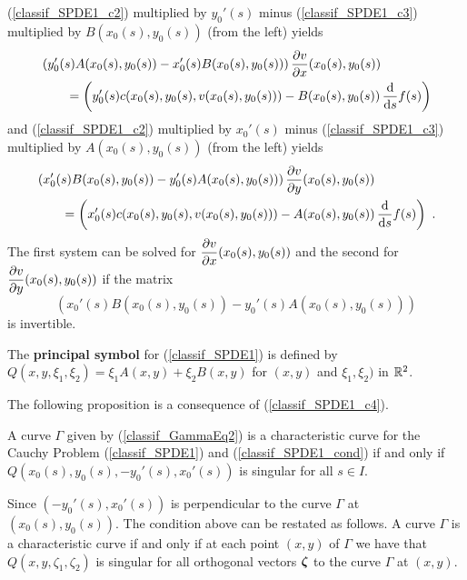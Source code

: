 (\ref{classif_SPDE1_c2}) multiplied by $y_0'(s)$ minus
(\ref{classif_SPDE1_c3}) multiplied by $B(x_0(s),y_0(s))$ (from the
left) yields
\begin{align*}
& \left( y_0'(s)A(x_0(s),y_0(s)) - x_0'(s)B(x_0(s),y_0(s)) \right)
\pdydx{v}{x}(x_0(s),y_0(s)) \\
&\qquad = \left( y_0'(s) c(x_0(s),y_0(s),v(x_0(s),y_0(s)))
- B(x_0(s),y_0(s))\,\dfdx{f}{s}(s)\right)
\end{align*}
and (\ref{classif_SPDE1_c2}) multiplied by $x_0'(s)$ minus
(\ref{classif_SPDE1_c3}) multiplied by $A(x_0(s),y_0(s))$ (from the
left) yields
\begin{align*}
&\left( x_0'(s)B(x_0(s),y_0(s)) - y_0'(s)A(x_0(s),y_0(s)) \right)
\pdydx{v}{y}(x_0(s),y_0(s)) \\
&\qquad = \left( x_0'(s) c(x_0(s),y_0(s),v(x_0(s),y_0(s)))
- A(x_0(s),y_0(s))\,\dfdx{f}{s}(s)\right) \ .
\end{align*}
The first system can be solved for
$\displaystyle \pdydx{v}{x}(x_0(s),y_0(s))$ and the second for
$\displaystyle \pdydx{v}{y}(x_0(s),y_0(s))$ if the matrix
\begin{equation} \label{classif_SPDE1_c4}
\left( x_0'(s)B(x_0(s),y_0(s)) - y_0'(s)A(x_0(s),y_0(s)) \right)
\end{equation}
is invertible.

\begin{defn}
The {\bfseries principal symbol} for
(\ref{classif_SPDE1}) is defined by
$\displaystyle
Q\left(x,y,\xi_1, \xi_2\right) = \xi_1 A(x,y) + \xi_2 B(x,y)$
for $(x,y)$ and $\xi_1,\xi_2)$ in $\RR^2$.
\end{defn}

The following proposition is a consequence of (\ref{classif_SPDE1_c4}).

\begin{prop}
A curve $\Gamma$ given by (\ref{classif_GammaEq2}) is a characteristic
curve for the Cauchy Problem (\ref{classif_SPDE1}) and
(\ref{classif_SPDE1_cond}) if and only if
$Q(x_0(s),y_0(s), -y_0'(s) , x_0'(s))$
is singular for all $s \in I$.
\end{prop}

Since $(-y_0'(s) , x_0'(s))$ is perpendicular to the curve $\Gamma$ at
$(x_0(s), y_0(s))$.  The condition above can be restated as follows.
A curve $\Gamma$ is a characteristic curve if and only if
at each point $(x,y)$ of $\Gamma$ we have that
$Q(x,y, \zeta_1 , \zeta_2)$ is singular for all orthogonal vectors
$\VEC{\zeta}$ to the curve $\Gamma$ at $(x,y)$.

